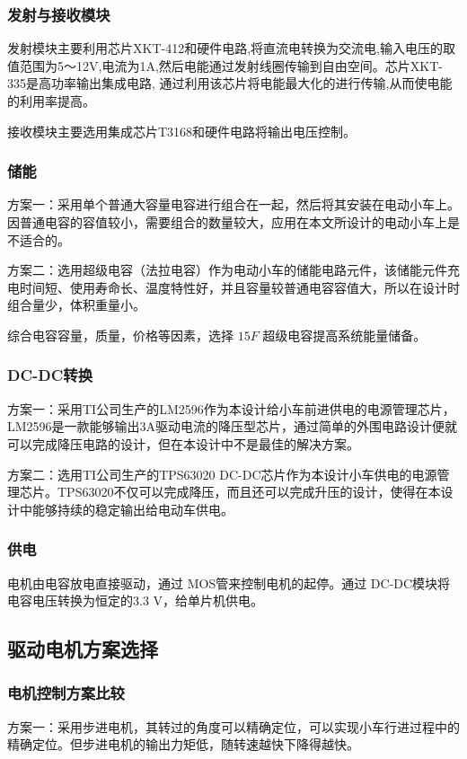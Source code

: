 \documentclass[UTF8]{ctexart}
\begin{document}
\subsubsection{发射与接收模块}
发射模块主要利用芯片XKT-412和硬件电路,将直流电转换为交流电,输入电压的取值范围为5～12V,电流为1A,然后电能通过发射线圈传输到自由空间。芯片XKT-335是高功率输出集成电路, 通过利用该芯片将电能最大化的进行传输,从而使电能的利用率提高。

接收模块主要选用集成芯片T3168和硬件电路将输出电压控制。
\subsubsection{储能}
方案一：采用单个普通大容量电容进行组合在一起，然后将其安装在电动小车上。因普通电容的容值较小，需要组合的数量较大，应用在本文所设计的电动小车上是不适合的。

方案二：选用超级电容（法拉电容）作为电动小车的储能电路元件，该储能元件充电时间短、使用寿命长、温度特性好，并且容量较普通电容容值大，所以在设计时组合量少，体积重量小。

综合电容容量，质量，价格等因素，选择 $ 15F $ 超级电容提高系统能量储备。
\subsubsection{DC-DC转换}
方案一：采用TI公司生产的LM2596作为本设计给小车前进供电的电源管理芯片，LM2596是一款能够输出3A驱动电流的降压型芯片，通过简单的外围电路设计便就可以完成降压电路的设计，但在本设计中不是最佳的解决方案。

方案二：选用TI公司生产的TPS63020 DC-DC芯片作为本设计小车供电的电源管理芯片。TPS63020不仅可以完成降压，而且还可以完成升压的设计，使得在本设计中能够持续的稳定输出给电动车供电。
\subsubsection{供电}
电机由电容放电直接驱动，通过 MOS管来控制电机的起停。通过 DC-DC模块将电容电压转换为恒定的3.3 V，给单片机供电。 

\subsection{驱动电机方案选择}
\subsubsection{电机控制方案比较}
方案一：采用步进电机，其转过的角度可以精确定位，可以实现小车行进过程中的精确定位。但步进电机的输出力矩低，随转速越快下降得越快。
\end{document}

